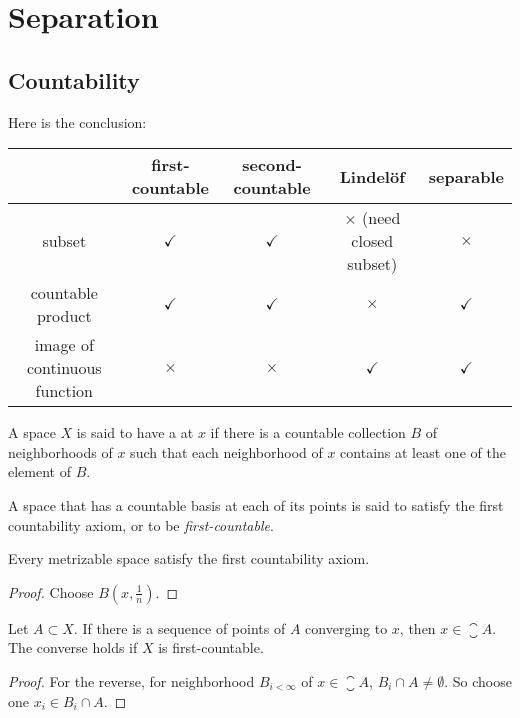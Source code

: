 \chapter{Separation}




\section{Countability}

Here is the conclusion:


\begin{center} 
   \begin{tabular}{ccccc}
   & first-countable & second-countable & Lindel\"of & separable \\
    \hline
    subset & $\checkmark$ & $\checkmark$ & $\times$ (need closed subset) & $\times$ \\
    countable product & $\checkmark$ & $\checkmark$ & $\times$ & $\checkmark$ \\
    image of continuous function & $\times$ & $\times$ & $\checkmark$ & $\checkmark$ \\
    \hline
\end{tabular} 
\end{center}


\begin{definition}
    A space $X$ is said to have a  at $x$ if there is a countable collection $B$ of neighborhoods of $x$ such that each neighborhood of $x$ contains at least one of the element of $B$.
    
    A space that has a countable basis at each of its points is said to satisfy the first countability axiom, or to be \emph{first-countable}.
\end{definition}

\begin{theorem}
    Every metrizable space satisfy the first countability axiom.    
\end{theorem}
\begin{proof}
    Choose $B(x, \frac{1}{n})$.
\end{proof}


\begin{theorem}\label{sequence_lemma}
    Let $A \subset X$. If there is a sequence of points of $A$ converging to $x$, then $x \in \closure{A}$. The converse holds if $X$ is first-countable.
\end{theorem}
\begin{proof}
    For the reverse, for neighborhood $B_{i<\infty}$ of $x\in \closure{A}$, $B_i \cap A \neq \emptyset$. So choose one $x_i \in B_i \cap A$.
\end{proof}


